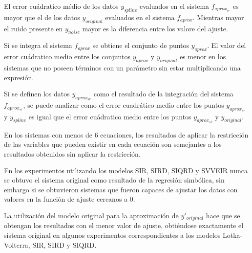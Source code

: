 El error cuádratico médio de los datos $y_{spline}$ evaluados en el sistema $f_{aprox_{sr}}$ es mayor que el de los datos $y_{original}$ evaluados en el sistema $f_{aprox}$. Mientras mayor el ruido presente en $y_{noise}$ mayor es la diferencia entre los valore del ajuste.

Si se integra el sistema $f_{aprox}$ se obtiene el conjunto de puntos $y_{aprox}$. El valor del error cuádratico medio entre los conjuntos $y_{aprox}$ y $y_{original}$ es menor en los sistemas que no poseen términos con un parámetro sin estar multiplicando una expresión.

Si se definen los datos $y_{aprox_{sr}}$ como el resultado de la integración del sistema $f_{aprox_{sr}}$, se puede analizar como el error cuadrático medio entre los puntos $y_{aprox_{sr}}$ y $y_{spline}$ es igual que el error cuádratico medio entre los puntos $y_{aprox_{sr}}$ y $y_{original}$.

En los sistemas con menos de 6 ecuaciones, los resultados de aplicar la restricción de las variables que pueden existir en cada ecuación son semejantes a los resultados obtenidos sin aplicar la restricción.

En los experimentos utilizando los modelos SIR, SIRD, SIQRD y SVVEIR nunca se obtuvo el sistema original como resultado de la regresión simbólica, sin embargo si se obtuvieron sistemas que fueron capaces de ajustar los datos con valores en la función de ajuste cercanos a 0.

La utilización del modelo original para la aproximación de $y'_{original}$ hace que se obtengan los resultados con el menor valor de ajuste, obtiéndose exactamente el sistema original en algunos experimentos correspondientes a los modelos Lotka-Volterra, SIR, SIRD y SIQRD.